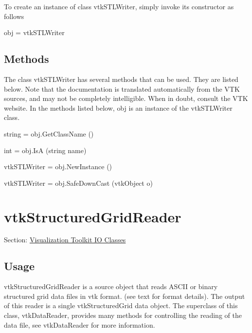 To create an instance of class vtk\-S\-T\-L\-Writer, simply invoke its constructor as follows \begin{DoxyVerb}  obj = vtkSTLWriter
\end{DoxyVerb}
 \hypertarget{vtkwidgets_vtkxyplotwidget_Methods}{}\subsection{Methods}\label{vtkwidgets_vtkxyplotwidget_Methods}
The class vtk\-S\-T\-L\-Writer has several methods that can be used. They are listed below. Note that the documentation is translated automatically from the V\-T\-K sources, and may not be completely intelligible. When in doubt, consult the V\-T\-K website. In the methods listed below, {\ttfamily obj} is an instance of the vtk\-S\-T\-L\-Writer class. 
\begin{DoxyItemize}
\item {\ttfamily string = obj.\-Get\-Class\-Name ()}  
\item {\ttfamily int = obj.\-Is\-A (string name)}  
\item {\ttfamily vtk\-S\-T\-L\-Writer = obj.\-New\-Instance ()}  
\item {\ttfamily vtk\-S\-T\-L\-Writer = obj.\-Safe\-Down\-Cast (vtk\-Object o)}  
\end{DoxyItemize}\hypertarget{vtkio_vtkstructuredgridreader}{}\section{vtk\-Structured\-Grid\-Reader}\label{vtkio_vtkstructuredgridreader}
Section\-: \hyperlink{sec_vtkio}{Visualization Toolkit I\-O Classes} \hypertarget{vtkwidgets_vtkxyplotwidget_Usage}{}\subsection{Usage}\label{vtkwidgets_vtkxyplotwidget_Usage}
vtk\-Structured\-Grid\-Reader is a source object that reads A\-S\-C\-I\-I or binary structured grid data files in vtk format. (see text for format details). The output of this reader is a single vtk\-Structured\-Grid data object. The superclass of this class, vtk\-Data\-Reader, provides many methods for controlling the reading of the data file, see vtk\-Data\-Reader for more information.

